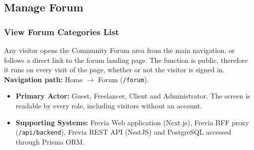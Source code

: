 
\subsection{Manage Forum}

\subsubsection{ View Forum Categories List}

Any visitor opens the Community Forum area from the main navigation, or follows a direct
link to the forum landing page. The function is public, therefore it runs on every visit of
the page, whether or not the visitor is signed in.\newline
\textbf{Navigation path:} Home $\rightarrow$ Forum (\texttt{/forum}).


\begin{itemize}[leftmargin=1.6em,topsep=3pt,itemsep=2pt,parsep=0pt,label=$\bullet$]
      \item \textbf{Primary Actor:} Guest, Freelancer, Client and Administrator. The screen is
            readable by every role, including visitors without an account.
      \item \textbf{Supporting Systems:} Frevia Web application (Next.js), Frevia BFF proxy
            (\texttt{/api/backend}), Frevia REST API (NestJS) and PostgreSQL accessed through
            Prisma ORM.
\end{itemize}

